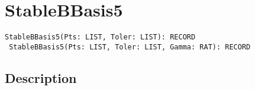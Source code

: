 \documentclass[a4paper]{mybook}
\newenvironment{command}{}{} %
\begin{document}
\section{StableBBasis5}
\label{StableBBasis5}
\begin{command} %


\begin{Verbatim}[label=syntax, rulecolor=\color{MidnightBlue},
frame=single]
 StableBBasis5(Pts: LIST, Toler: LIST): RECORD
 StableBBasis5(Pts: LIST, Toler: LIST, Gamma: RAT): RECORD
 \end{Verbatim}


\subsection*{Description}


\end{command}
\end{document}
